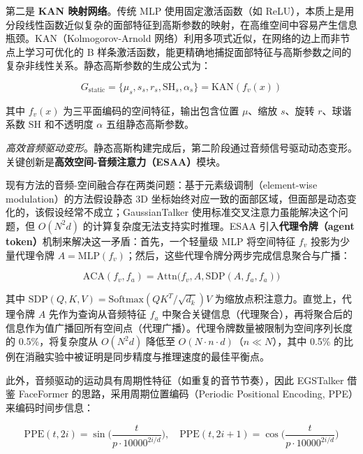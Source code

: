 第二是 \textbf{KAN 映射网络}。传统 MLP 使用固定激活函数（如 ReLU），本质上是用分段线性函数近似复杂的面部特征到高斯参数的映射，在高维空间中容易产生信息瓶颈。KAN（Kolmogorov-Arnold 网络）利用多项式近似，在网络的边上而非节点上学习可优化的 B 样条激活函数，能更精确地捕捉面部特征与高斯参数之间的复杂非线性关系。静态高斯参数的生成公式为：

\begin{equation}
    G_{\text{static}} = \{\mu_s, s_s, r_s, \text{SH}_s, \alpha_s\} = \text{KAN}(f_v(x))
\end{equation}

其中 $f_v(x)$ 为三平面编码的空间特征，输出包含位置 $\mu$、缩放 $s$、旋转 $r$、球谐系数 $\text{SH}$ 和不透明度 $\alpha$ 五组静态高斯参数。

\textit{高效音频驱动变形}。静态高斯构建完成后，第二阶段通过音频信号驱动动态变形。关键创新是\textbf{高效空间-音频注意力（ESAA）}模块。

现有方法的音频-空间融合存在两类问题：基于元素级调制（element-wise modulation）的方法假设静态 3D 坐标始终对应一致的面部区域，但面部是动态变化的，该假设经常不成立；GaussianTalker 使用标准交叉注意力虽能解决这个问题，但 $O(N^2 d)$ 的计算复杂度无法支持实时推理。ESAA 引入\textbf{代理令牌（agent token）}机制来解决这一矛盾：首先，一个轻量级 MLP 将空间特征 $f_v$ 投影为少量代理令牌 $A = \text{MLP}(f_v)$；然后，这些代理令牌分两步完成信息聚合与广播：

\begin{equation}
    \text{ACA}(f_v, f_a) = \text{Attn}\big(f_v, A, \text{SDP}(A, f_a, f_a)\big)
\end{equation}

其中 $\text{SDP}(Q, K, V) = \text{Softmax}(QK^T / \sqrt{d_k})V$ 为缩放点积注意力。直觉上，代理令牌 $A$ 先作为查询从音频特征 $f_a$ 中聚合关键信息（代理聚合），再将聚合后的信息作为值广播回所有空间点（代理广播）。代理令牌数量被限制为空间序列长度的 0.5\%，将复杂度从 $O(N^2 d)$ 降低至 $O(N \cdot n \cdot d)$（$n \ll N$），其中 0.5\% 的比例在消融实验中被证明是同步精度与推理速度的最佳平衡点。

此外，音频驱动的运动具有周期性特征（如重复的音节节奏），因此 EGSTalker 借鉴 FaceFormer 的思路，采用周期位置编码（Periodic Positional Encoding, PPE）来编码时间步信息：

\begin{equation}
    \text{PPE}(t, 2i) = \sin\!\Big(\frac{t}{p \cdot 10000^{2i/d}}\Big), \quad \text{PPE}(t, 2i\!+\!1) = \cos\!\Big(\frac{t}{p \cdot 10000^{2i/d}}\Big)
\end{equation}

